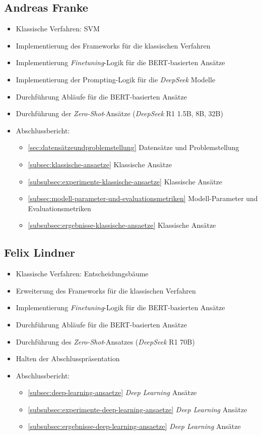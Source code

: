 \begin{multicols}{2}
\subsection{Andreas Franke}
\begin{itemize}
    \item Klassische Verfahren: SVM
    \item Implementierung des Frameworks für die klassischen Verfahren
    \item Implementierung \textit{Finetuning}-Logik für die BERT-basierten Ansätze
    \item Implementierung der Prompting-Logik für die \textit{DeepSeek} Modelle
    \item Durchführung Abläufe für die BERT-basierten Ansätze
    \item Durchführung der \textit{Zero-Shot}-Ansätze (\textit{DeepSeek} R1 1.5B, 8B, 32B)
    \item Abschlussbericht:
    \begin{itemize}
        \item \ref{sec:datensätzeundproblemstellung} Datensätze und Problemstellung
        \item \ref{subsec:klassische-ansaetze} Klassische Ansätze
        \item \ref{subsubsec:experimente-klassische-ansaetze} Klassische Ansätze
        \item \ref{subsec:modell-parameter-und-evaluationsmetriken} Modell-Parameter und Evaluationsmetriken
        \item \ref{subsubsec:ergebnisse-klassische-ansaetze} Klassische Ansätze
    \end{itemize}
\end{itemize}

\subsection{Felix Lindner}
\begin{itemize}
    \item Klassische Verfahren: Entscheidungsbäume
    \item Erweiterung des Frameworks für die klassischen Verfahren
    \item Implementierung \textit{Finetuning}-Logik für die BERT-basierten Ansätze
    \item Durchführung Abläufe für die BERT-basierten Ansätze
    \item Durchführung des \textit{Zero-Shot}-Ansatzes (\textit{DeepSeek} R1 70B)
    \item Halten der Abschlusspräsentation
    \item Abschlussbericht:
    \begin{itemize}
        \item \ref{subsec:deep-learning-ansaetze} \textit{Deep Learning} Ansätze
        \item \ref{subsubsec:experimente-deep-learning-ansaetze} \textit{Deep Learning} Ansätze
        \item \ref{subsubsec:ergebnisse-deep-learning-ansaetze} \textit{Deep Learning} Ansätze
    \end{itemize}
\end{itemize}


\end{multicols}
